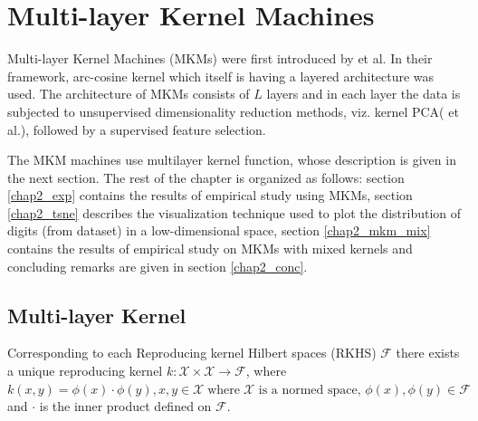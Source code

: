 \chapter{Multi-layer Kernel Machines}
\label{chap_mkm}


Multi-layer Kernel Machines (MKMs) were first introduced by \cite{saul} et al. In their framework, arc-cosine kernel  which itself is having a layered architecture was used. The architecture of MKMs consists of $L$ layers and in each layer the data is subjected to unsupervised dimensionality reduction methods, viz. kernel PCA(\cite{kpca} et al.),  followed by a supervised feature selection. 

The MKM machines use multilayer kernel function, whose description is given in the next section. The rest of the chapter is organized as follows: section \ref{chap2_exp} contains the results of empirical study using MKMs, section \ref{chap2_tsne} describes the visualization technique used to plot the distribution of digits (from \cite{mnist} dataset) in a low-dimensional space, section \ref{chap2_mkm_mix} contains the results of empirical study on MKMs with mixed kernels and  concluding remarks are given in section \ref{chap2_conc}.  

\section{Multi-layer Kernel}
Corresponding to each Reproducing kernel Hilbert spaces (RKHS) $\mathcal{F}$ there exists a unique reproducing kernel 
$k: \mathcal{X} \times \mathcal{X} \rightarrow \mathcal{F}$,  where $ k(x,y) = \phi(x) \cdot \phi(y), x, y \in \mathcal{X} \; \text{where} \; \mathcal{X}    \text{ is a normed space, } \phi(x), \phi(y) \in \mathcal{F}$ and $\cdot$ is the inner product defined on $\mathcal{F}$.

